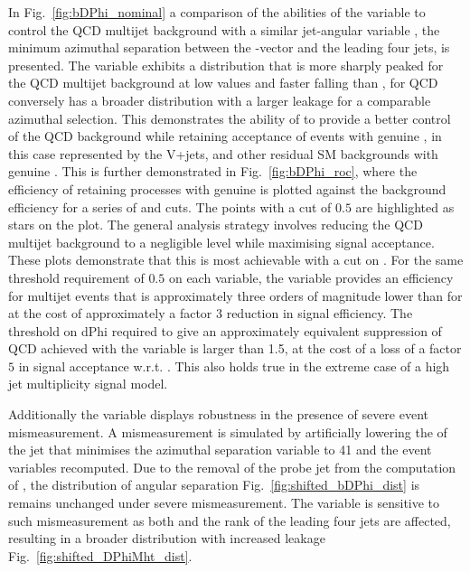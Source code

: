 In Fig.~\ref{fig:bDPhi_nominal} a comparison of the abilities of the \bdphi variable to 
control the QCD multijet background with 
a similar jet-\mht angular variable \dphimhtj, the minimum azimuthal separation between the \mht-vector and the leading four
jets, is presented. The \bdphi variable exhibits a distribution that
is more sharply peaked for the QCD multijet background 
at low values and faster falling than \dphimhtj,  \dphimhtj for QCD conversely has a broader 
distribution with a larger leakage for a comparable azimuthal
selection. This demonstrates the ability of \bdphi to provide a better
control of the QCD background while retaining acceptance of events with genuine \mht,
in this case represented by the V+jets, \ttbar and other residual SM
backgrounds with genuine \met. This is
further demonstrated in Fig.~\ref{fig:bDPhi_roc}, where the efficiency
of retaining processes with genuine \mht is plotted against the
background efficiency for a series of \bdphi and \dphimhtj cuts. The
points with a cut of $0.5$ are highlighted as stars on the plot. The
general analysis strategy involves reducing the QCD multijet
background to a negligible level while maximising signal acceptance. These plots demonstrate that this is
most achievable with a cut on \bdphi. For the same threshold
requirement of $0.5$ on each variable, the \bdphi variable provides an
efficiency for multijet events that is approximately three orders of
magnitude lower than for \dphimhtj at the cost of approximately a factor $3$
reduction in signal efficiency. The threshold on dPhi required to give
an approximately equivalent suppression of QCD achieved with the
\dphimhtj
variable is larger than 1.5, at the cost of a loss of a factor $5$ in
signal acceptance w.r.t. \bdphi. This also holds true in the extreme
case of a high jet multiplicity signal model.

Additionally the \bdphi variable displays robustness in the 
presence of severe event mismeasurement. A mismeasurement is simulated by artificially lowering 
the \pt of the jet that minimises the azimuthal separation variable to 41 \GeV and the event 
variables recomputed. Due to the removal of the probe jet from the computation of \bdphi, the 
distribution of angular separation Fig.~\ref{fig:shifted_bDPhi_dist} is 
remains unchanged under severe mismeasurement. The \dphimhtj variable is
 sensitive to such mismeasurement as both \mht and the rank of the 
leading four jets are affected, resulting in a broader distribution with
increased leakage Fig.~\ref{fig:shifted_DPhiMht_dist}.

